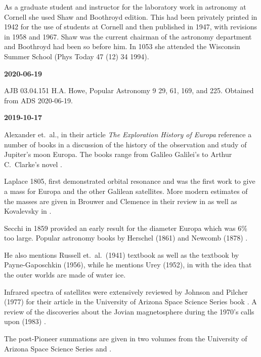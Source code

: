 As a graduate student and instructor for the laboratory work in
astronomy at Cornell she used Shaw and Boothroyd   edition. This had been privately printed in 1942 for the use of
students at Cornell and then published in 1947, with revisions in 1958
and 1967. Shaw was the current chairman of the astronomy department and
Boothroyd had been so before him. In 1053 she attended the Wisconsin
Summer School (Phys Today 47 (12) 34 1994).


{\bf 2020-06-19}

AJB 03.04.151 H.A. Howe, 
Popular Astronomy 9 29, 61, 169, and 225. Obtained from ADS 2020-06-19.

{\bf 2019-10-17}

Alexander et.\ al., in their article {\it The Exploration History of
Europa} \cite{Alexander2009} reference a number of books in a
discussion of the history of the observation and study of Jupiter's
moon Europa.  The books range from Galileo Galilei's  \cite{Galilei1989} to Arthur C.\ Clarke's novel  \cite{Clarke1982}.

Laplace 1805,  \cite{Laplace1805} first
demonstrated orbital resonance and was the first work to give a mass
for Europa and the other Galilean satellites. More modern estimates of
the masses are given in Brouwer and Clemence \cite{Brouwer1961} in
their review in  \cite{Kuiper1961} as well
as Kovalevsky \cite{Kovalevsky1970} in  \cite{Dollfus1970}.

Secchi in 1859 \cite{Secchi1859} provided an early result for the
diameter Europa which was 6\% too large.  Popular astronomy books by
Herschel (1861) \cite{Herschel1861} and Newcomb
(1878) \cite{Newcomb1878}.

He also mentions Russell et.\ al.\ (1941) \cite{Russell1941} textbook
 as well as the textbook by Payne-Gaposchkin (1956),
 \cite{Payne-Gaposchkin1956} while he mentions
Urey (1952), in  \cite{Urey1952} with the idea that
the outer worlds are made of water ice.

Infrared spectra of satellites were extensively reviewed by Johnson
and Pilcher (1977) \cite{Johnson1977} for their article in the
University of Arizona Space Science Series book  \cite{Burns1977}. A review of the discoveries about
the Jovian magnetosphere during the 1970's calls upon  (1983) \cite{Dressler1983}.

The post-Pioneer summations are given in two volumes from the
University of Arizona Space Science Series  \cite{Burns1977} and \cite{Gehrels1976}.


 \cite{Morrison1982}
